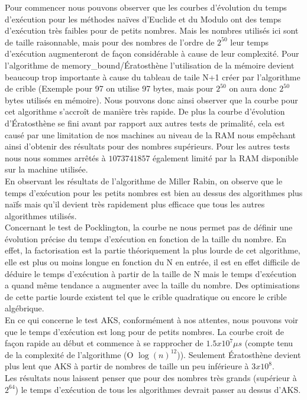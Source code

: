	Pour commencer nous pouvons observer que les courbes d'évolution du temps d'exécution pour les méthodes naïves d'Euclide et du Modulo ont des temps d'exécution très faibles pour de petits nombres. Mais les nombres utilisés ici sont de taille raisonnable, mais pour des nombres de l'ordre de $2^{50}$ leur temps d'exécution augmenteront de façon considérable à cause de leur complexité. Pour l'algorithme de memory\_bound/Ératosthène l'utilisation de la mémoire devient beaucoup trop importante à cause du tableau de taile N+1 créer par l'algorithme de crible (Exemple pour 97 on utilise 97 bytes, mais pour $2^{50}$ on aura donc $2^{50}$ bytes utilisés en mémoire). Nous pouvons donc ainsi observer que la courbe pour cet algorithme s'accroît de manière très rapide. De plus la courbe d'évolution d’Ératosthène se fini avant par rapport aux autres tests de primalité, cela est causé par une limitation de nos machines au niveau de la RAM nous empêchant ainsi d'obtenir des résultats pour des nombres supérieurs. Pour les autres tests nous nous sommes arrêtés à $1073741857$ également limité par la RAM disponible sur la machine utilisée.\\	
	
	En observant les résultats de l’algorithme de Miller Rabin, on observe que le temps d’exécution pour les petits nombres est bien au dessus des algorithmes plus naïfs mais qu’il devient très rapidement plus efficace que tous les autres algorithmes utilisés. \\		
		
		Concernant le test de Pocklington, la courbe ne nous permet pas de définir une évolution précise du temps d'exécution en fonction de la taille du nombre. En effet, la factorisation est la partie théoriquement la plus lourde de cet algorithme, elle est plus ou moins longue en fonction du N en entrée, il est en effet difficile de déduire le temps d’exécution à partir de la taille de N mais le temps d'exécution a quand même tendance a augmenter avec la taille du nombre. Des optimisations de cette partie lourde existent tel que le crible quadratique ou encore le crible algébrique.\\		
		En ce qui concerne le test AKS, conformément à nos attentes, nous pouvons voir que le temps d’exécution est long pour de petits nombres. La courbe croit de façon rapide au début et commence à se rapprocher de $1.5x10^7 \mu s$ (compte tenu de la complexité de l’algorithme (O $\log(n)^{12}$)). Seulement Ératosthène devient plus lent que AKS à partir de nombres de taille un peu inférieure à $3x10^8$. \\
Les résultats nous laissent penser que pour des nombres très grands (supérieur à $2^{64}$) le temps d'exécution de tous les algorithmes devrait passer au dessus d’AKS.\\

